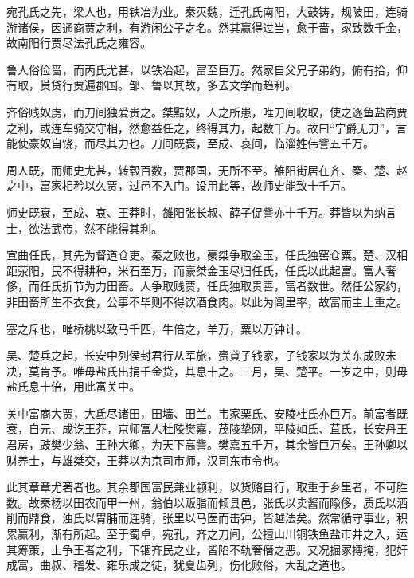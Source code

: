 \documentclass[12pt,UTF8]{ctexbook}
\begin{document}
宛孔氏之先，梁人也，用铁冶为业。秦灭魏，迁孔氏南阳，大鼓铸，规陂田，连骑游诸侯，因通商贾之利，有游闲公子之名。然其赢得过当，愈于啬，家致数千金，故南阳行贾尽法孔氏之雍容。



鲁人俗俭啬，而丙氏尤甚，以铁冶起，富至巨万。然家自父兄子弟约，俯有拾，仰有取，贳贷行贾遍郡国。邹、鲁以其故，多去文学而趋利。



齐俗贱奴虏，而刀间独爱贵之。桀黠奴，人之所患，唯刀间收取，使之逐鱼盐商贾之利，或连车骑交守相，然愈益任之，终得其力，起数千万。故曰“宁爵无刀”，言能使豪奴自饶，而尽其力也。刀间既衰，至成、哀间，临淄姓伟訾五千万。



周人既，而师史尤甚，转毂百数，贾郡国，无所不至。雒阳街居在齐、秦、楚、赵之中，富家相矜以久贾，过邑不入门。设用此等，故师史能致十千万。



师史既衰，至成、哀、王莽时，雒阳张长叔、薛子促訾亦十千万。莽皆以为纳言士，欲法武帝，然不能得其利。



宣曲任氏，其先为督道仓吏。秦之败也，豪桀争取金玉，任氏独窖仓粟。楚、汉相距荥阳，民不得耕种，米石至万，而豪桀金玉尽归任氏，任氏以此起富。富人奢侈，而任氏折节为力田畜。人争取贱贾，任氏独取贵善，富者数世。然任公家约，非田畜所生不衣食，公事不毕则不得饮酒食肉。以此为闾里率，故富而主上重之。



塞之斥也，唯桥桃以致马千匹，牛倍之，羊万，粟以万钟计。



吴、楚兵之起，长安中列侯封君行从军旅，赍貣子钱家，子钱家以为关东成败未决，莫肯予。唯毋盐氏出捐千金贷，其息十之。三月，吴、楚平。一岁之中，则毋盐氏息十倍，用此富关中。



关中富商大贾，大氐尽诸田，田墙、田兰。韦家栗氏、安陵杜氏亦巨万。前富者既衰，自元、成讫王莽，京师富人杜陵樊嘉，茂陵挚网，平陵如氏、苴氏，长安丹王君房，豉樊少翁、王孙大卿，为天下高訾。樊嘉五千万，其余皆巨万矣。王孙卿以财养士，与雄桀交，王莽以为京司市师，汉司东市令也。



此其章章尤著者也。其余郡国富民兼业颛利，以货赂自行，取重于乡里者，不可胜数。故秦杨以田农而甲一州，翁伯以贩脂而倾县邑，张氏以卖酱而隃侈，质氏以洒削而鼎食，浊氏以胃脯而连骑，张里以马医而击钟，皆越法矣。然常循守事业，积累赢利，渐有所起。至于蜀卓，宛孔，齐之刀间，公擅山川铜铁鱼盐市井之入，运其筹策，上争王者之利，下锢齐民之业，皆陷不轨奢僭之恶。又况掘冢搏掩，犯奸成富，曲叔、稽发、雍乐成之徒，犹夏齿列，伤化败俗，大乱之道也。
\end{document}
